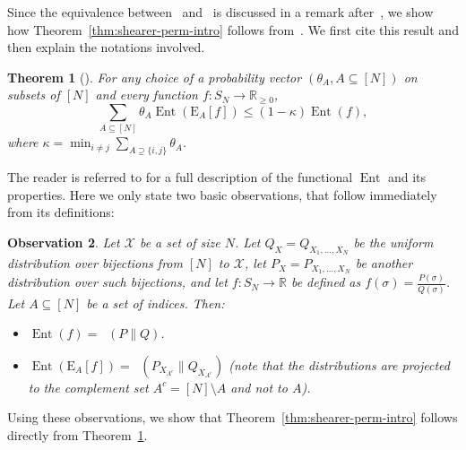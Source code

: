 \documentclass[11pt]{article}
\newtheorem{theorem}{Theorem}[section]
\newtheorem{observation}[theorem]{Observation}
\DeclareMathOperator{\KL}{D_{\text{KL}}}
\DeclareMathOperator{\Ent}{\text{Ent}}
\newcommand{\RR}{\mathbb{R}}
\begin{document}
\medskip \noindent Since the equivalence between~\cite[Proposition~21]{BartheCLM11} and~\cite[Theorem~4]{CaputoS24} is discussed in a remark after~\cite[Theorem~4]{CaputoS24}, we show how Theorem~\ref{thm:shearer-perm-intro} follows from~\cite[Theorem~4]{CaputoS24}. We first cite this result and then explain the notations involved.
\begin{theorem}[{\cite[Theorem~4, Equation (34)]{CaputoS24}}]\label{thm:shearer perm caputo}
For any choice of a probability vector $(\theta_A, A \subseteq [N])$ on subsets of $[N]$ and every function $f:S_N \to \RR_{\ge 0}$,
\[
    \sum_{A \subseteq [N]} \theta_A\Ent(\text{E}_A[f]) \le (1-\kappa)\Ent(f),
\]
where $\kappa = \min_{i \ne j} \sum_{A \supseteq \{i,j\}} \theta_A$.
\end{theorem}
The reader is referred to \cite{CaputoS24} for a full description of the functional $\Ent$ and its properties. Here we only state two basic observations, that follow immediately from its definitions:
\begin{observation}\label{obs:ent VS KL}
Let $\mathcal{X}$ be a set of size $N$. Let $Q_X = Q_{X_1,\ldots,X_N}$ be the uniform distribution over bijections from $[N]$ to $\mathcal{X}$, let $P_X = P_{X_1,\ldots,X_N}$ be another distribution over such bijections, and let $f:S_N \to \RR$ be defined as $f(\sigma) = \frac{P(\sigma)}{Q(\sigma)}$. Let $A \subseteq [N]$ be a set of indices. Then:
\begin{itemize}
    \item $\Ent(f) = \KL(P \| Q)$.
    \item $\Ent(\text{E}_A[f]) = \KL( P_{X_{A^c}} \| Q_{X_{A^c}} )$ (note that the distributions are projected to the complement set $A^c = [N] \setminus A$ and not to $A$).
\end{itemize}
\end{observation}
\noindent Using these observations, we show that Theorem~\ref{thm:shearer-perm-intro} follows directly from Theorem~\ref{thm:shearer perm caputo}.

\medskip 
\end{document}
